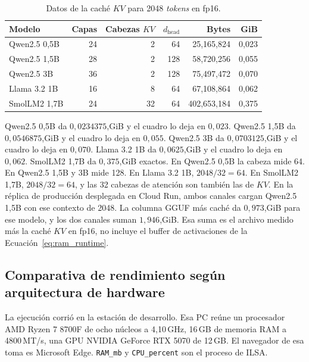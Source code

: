 \begin{table}[H]
\centering
\footnotesize
\setlength{\tabcolsep}{4pt}
\caption{Datos de la caché $KV$ para 2048 \textit{tokens} en fp16.}
\label{tab:kv_calculo}
\begin{tabular}{lrrrrr}
\toprule
\textbf{Modelo} & \textbf{Capas} & \textbf{Cabezas $KV$} & $d_{\text{head}}$ & \textbf{Bytes} & \textbf{GiB} \\
\midrule
Qwen2.5 0,5B & 24 & 2 & 64 & 25,165,824 & 0,023 \\
Qwen2.5 1,5B & 28 & 2 & 128 & 58,720,256 & 0,055 \\
Qwen2.5 3B & 36 & 2 & 128 & 75,497,472 & 0,070 \\
Llama 3.2 1B & 16 & 8 & 64 & 67,108,864 & 0,062 \\
SmolLM2 1,7B & 24 & 32 & 64 & 402,653,184 & 0,375 \\
\bottomrule
\end{tabular}
\end{table}

Qwen2.5 0,5B da $0{,}0234375$,GiB y el cuadro lo deja en $0{,}023$. Qwen2.5 1,5B da $0{,}0546875$,GiB y el cuadro lo deja en $0{,}055$. Qwen2.5 3B da $0{,}0703125$,GiB y el cuadro lo deja en $0{,}070$. Llama 3.2 1B da $0{,}0625$,GiB y el cuadro lo deja en $0{,}062$. SmolLM2 1,7B da $0{,}375$,GiB exactos. En Qwen2.5 0,5B la cabeza mide 64. En Qwen2.5 1,5B y 3B mide 128. En Llama 3.2 1B, $2048 / 32 = 64$. En SmolLM2 1,7B, $2048 / 32 = 64$, y las 32 cabezas de atención son también las de $KV$. En la réplica de producción desplegada en Cloud Run, ambos canales cargan Qwen2.5 1,5B con ese contexto de 2048. La columna GGUF más caché da $0{,}973$,GiB para ese modelo, y los dos canales suman $1{,}946$,GiB. Esa suma es el archivo medido más la caché $KV$ en fp16, no incluye el buffer de activaciones de la Ecuación~\ref{eq:ram_runtime}.

\subsection{Comparativa de rendimiento según arquitectura de hardware}
\label{sec:hw_comparacion}
\label{sec:hardware_objetivo}

La ejecución corrió en la estación de desarrollo. Esa PC reúne un procesador AMD Ryzen 7 8700F de ocho núcleos a 4,10\,GHz, 16\,GB de memoria RAM a 4800\,MT/s, una GPU NVIDIA GeForce RTX 5070 de 12\,GB. El navegador de esa toma es Microsoft Edge. \texttt{RAM\_mb} y \texttt{CPU\_percent} son el proceso de ILSA.

